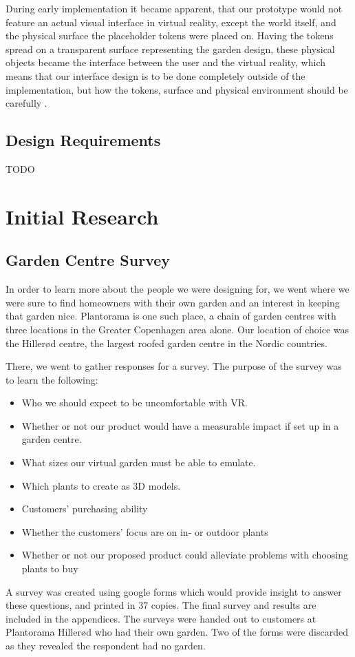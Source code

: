During early implementation it became apparent, that our prototype would not feature an actual visual interface in virtual reality, except the world itself, and the physical surface the placeholder tokens were placed on.
Having the tokens spread on a transparent surface representing the garden design, these physical objects became the interface between the user and the virtual reality, which means that our interface design is to be done completely outside of the implementation, but how the tokens, surface and physical environment should be carefully .


\subsection{Design Requirements}
TODO

\section{Initial Research}
\subsection{Garden Centre Survey}

In order to learn more about the people we were designing for, we went where we were sure to find homeowners with their own garden and an interest in keeping that garden nice. Plantorama is one such place, a chain of garden centres with three locations in the Greater Copenhagen area alone. Our location of choice was the Hillerød centre, the largest roofed garden centre in the Nordic countries. 

There, we went to gather responses for a survey. 
The purpose of the survey was to learn the following:

\begin{itemize}
	\item Who we should expect to be uncomfortable with VR.
	\item Whether or not our product would have a measurable impact if set up in a garden centre.
	\item What sizes our virtual garden must be able to emulate.
	\item Which plants to create as 3D models.
	\item Customers' purchasing ability
	\item Whether the customers' focus are on in- or outdoor plants
	\item Whether or not our proposed product could alleviate problems with choosing plants to buy
\end{itemize}
A survey was created using google forms which would provide insight to answer these questions, and printed in 37 copies. The final survey and results are included in the appendices. The surveys were handed out to customers at Plantorama Hillerød who had their own garden. Two of the forms were discarded as they revealed the respondent had no garden. %

